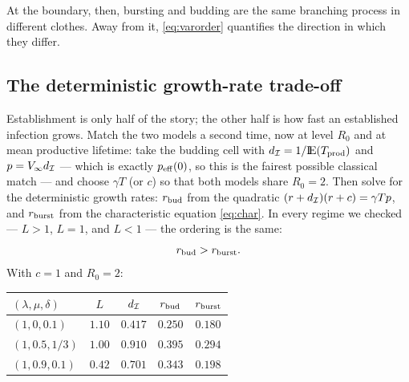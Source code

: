 At the boundary, then, bursting and budding are the same branching process
in different clothes. Away from it, \eqref{eq:varorder} quantifies the
direction in which they differ.

\subsection{The deterministic growth-rate trade-off}
\label{sec:r-tradeoff}

Establishment is only half of the story; the other half is how fast an
established infection grows. Match the two models a second time, now at
level $R_0$ and at mean productive lifetime: take the budding cell with
$d_{\mathcal{I}}=1/{\rm I}\!{\rm E}(T_{\rm prod})$ and $p=V_\infty d_{\mathcal{I}}$ --- which
is exactly $p_{\rm eff}(0)$, so this is the fairest possible classical
match --- and choose $\gamma T$ (or $c$) so that both models share
$R_0=2$. Then solve for the deterministic growth rates: $r_{\rm bud}$ from
the quadratic $(r+d_{\mathcal{I}})(r+c)=\gamma Tp$, and $r_{\rm burst}$ from
the characteristic equation \eqref{eq:char}. In every regime we checked
--- $L>1$, $L=1$, and $L<1$ --- the ordering is the same:
\begin{equation}
r_{\rm bud}>r_{\rm burst}.
\end{equation}
With $c=1$ and $R_0=2$:
\begin{center}
\renewcommand{\arraystretch}{1.2}
\begin{tabular}{@{}lcccc@{}}
\toprule
$(\lambda,\mu,\delta)$ & $L$ & $d_{\mathcal{I}}$ & $r_{\rm bud}$ & $r_{\rm burst}$ \\
\midrule
$(1,0,0.1)$ & $1.10$ & $0.417$ & $0.250$ & $0.180$ \\
$(1,0.5,1/3)$ & $1.00$ & $0.910$ & $0.395$ & $0.294$ \\
$(1,0.9,0.1)$ & $0.42$ & $0.701$ & $0.343$ & $0.198$ \\
\bottomrule
\end{tabular}
\end{center}
